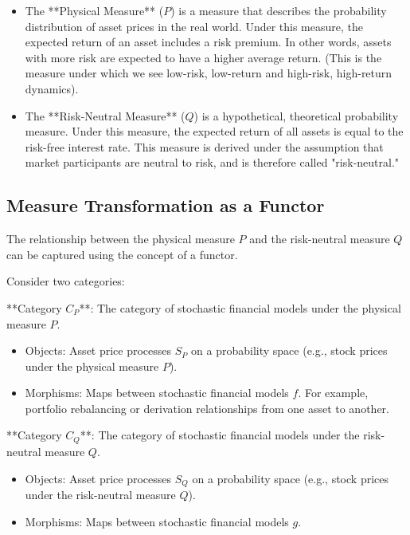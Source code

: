 \documentclass[uplatex,a4j,12pt,dvipdfmx]{jsarticle}
\begin{document}
\begin{itemize}
	\item The **Physical Measure** ($P$) is a measure that describes the probability distribution of asset prices in the real world. Under this measure, the expected return of an asset includes a risk premium. In other words, assets with more risk are expected to have a higher average return. (This is the measure under which we see low-risk, low-return and high-risk, high-return dynamics).
	\item The **Risk-Neutral Measure** ($Q$) is a hypothetical, theoretical probability measure. Under this measure, the expected return of all assets is equal to the risk-free interest rate. This measure is derived under the assumption that market participants are neutral to risk, and is therefore called "risk-neutral."
\end{itemize}

\subsection{Measure Transformation as a Functor}

The relationship between the physical measure $P$ and the risk-neutral measure $Q$ can be captured using the concept of a functor.

\medskip

Consider two categories:

**Category $C_{P}$**: The category of stochastic financial models under the physical measure $P$.
\begin{itemize}
	\item Objects: Asset price processes $S_{P}$ on a probability space (e.g., stock prices under the physical measure $P$).
	\item Morphisms: Maps between stochastic financial models $f$. For example, portfolio rebalancing or derivation relationships from one asset to another.
\end{itemize}

\medskip

**Category $C_{Q}$**: The category of stochastic financial models under the risk-neutral measure $Q$.
\begin{itemize}
	\item Objects: Asset price processes $S_{Q}$ on a probability space (e.g., stock prices under the risk-neutral measure $Q$).
	\item Morphisms: Maps between stochastic financial models $g$.
\end{itemize}
\end{document}
